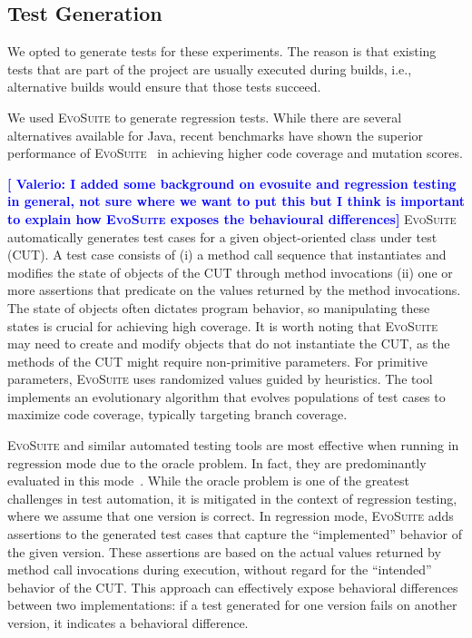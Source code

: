 \documentclass[conference]{IEEEtran}
\makeatletter
\newcommand{\evosuite}{\textsc{EvoSuite}\@\xspace}
\newcommand{\valerio}[1]{\textbf{\textcolor{blue}{[ \ding{46}Valerio: #1]}}}
\makeatother
\begin{document}
\subsection{Test Generation}

We opted to generate tests for these experiments. The reason is that existing tests that are part of the project are usually executed during builds, i.e., alternative builds would ensure that those tests succeed. 


We used \evosuite to generate regression tests. While there are several alternatives available for Java, recent benchmarks have shown the superior performance of \evosuite~\cite{jahangirova2023sbft} in achieving higher code coverage and mutation scores. 

\valerio{I added some background on evosuite and regression testing in general, not sure where we want to put this but I think is important to explain how \evosuite exposes the behavioural differences}
\evosuite automatically generates test cases for a given object-oriented class under test (CUT). A test case consists of (i) a method call sequence that instantiates and modifies the state of objects of the CUT through method invocations (ii) one or more assertions that predicate on the values returned by the method invocations. The state of objects often dictates program behavior, so manipulating these states is crucial for achieving high coverage. It is worth noting that \evosuite may need to create and modify objects that do not instantiate the CUT, as the methods of the CUT might require non-primitive parameters. For primitive parameters, \evosuite uses randomized values guided by heuristics. The tool implements an evolutionary algorithm that evolves populations of test cases to maximize code coverage, typically targeting branch coverage.

\evosuite and similar automated testing tools are most effective when running in regression mode due to the oracle problem. In fact, they are predominantly evaluated in this mode~\cite{jahangirova2023sbft,shamshiri2015automatically}. While the oracle problem is one of the greatest challenges in test automation, it is mitigated in the context of regression testing, where we assume that one version is correct. In regression mode, \evosuite adds assertions to the generated test cases that capture the ``implemented'' behavior of the given version. These assertions are based on the actual values returned by method call invocations during execution, without regard for the ``intended'' behavior of the CUT. This approach can effectively expose behavioral differences between two implementations: if a test generated for one version fails on another version, it indicates a behavioral difference.
\end{document}
